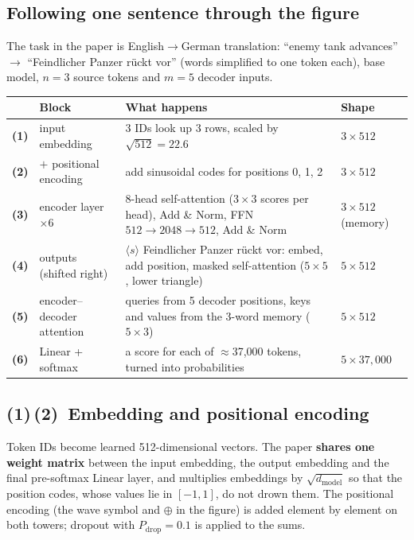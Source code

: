 \documentclass[11pt]{article}
\newcommand{\blk}[1]{\textbf{(#1)}}
\begin{document}
\subsection{Following one sentence through the figure}
The task in the paper is English$\to$German translation: ``enemy tank advances'' $\to$ ``Feindlicher Panzer rückt vor'' (words simplified to one token each), base model, $n=3$ source tokens and $m=5$ decoder inputs.
\begin{center}\small\renewcommand{\arraystretch}{1.25}
\begin{tabularx}{\textwidth}{c l X l}\toprule
 & \textbf{Block} & \textbf{What happens} & \textbf{Shape}\\\midrule
\blk1 & input embedding & 3 IDs look up 3 rows, scaled by $\sqrt{512}=22.6$ & $3\times512$\\
\blk2 & $+$ positional encoding & add sinusoidal codes for positions 0, 1, 2 & $3\times512$\\
\blk3 & encoder layer $\times6$ & 8-head self-attention ($3\times3$ scores per head), Add \& Norm, FFN $512\to2048\to512$, Add \& Norm & $3\times512$ (memory)\\
\blk4 & outputs (shifted right) & $\langle s\rangle$ Feindlicher Panzer rückt vor: embed, add position, masked self-attention ($5\times5$, lower triangle) & $5\times512$\\
\blk5 & encoder--decoder attention & queries from 5 decoder positions, keys and values from the 3-word memory ($5\times3$) & $5\times512$\\
\blk6 & Linear + softmax & a score for each of $\approx$37,000 tokens, turned into probabilities & $5\times37{,}000$\\\bottomrule
\end{tabularx}\end{center}

\subsection{\blk1\,\blk2\ Embedding and positional encoding}
Token IDs become learned 512-dimensional vectors. The paper \textbf{shares one weight matrix} between the input embedding, the output embedding and the final pre-softmax Linear layer, and multiplies embeddings by $\sqrt{d_{\text{model}}}$ so that the position codes, whose values lie in $[-1,1]$, do not drown them. The positional encoding (the wave symbol and $\oplus$ in the figure) is added element by element on both towers; dropout with $P_{\text{drop}}=0.1$ is applied to the sums.
\end{document}
